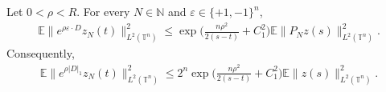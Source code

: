 \documentclass[print,wide]{draft}
\begin{document}
\begin{proposition}
\label{prop:finite-analytic-energy}
Let $0<\rho<R$.  For every $N\in\mathbb{N}$ and
$\varepsilon\in\{+1,-1\}^n$,
\begin{align}\label{eq:one-sided-shift-estimate}
\mathbb{E}\bigl\lVert e^{\rho\varepsilon\cdot D}z_N(t)\bigr\rVert_{L^2(\mathbb{T}^n)}^2
\leq
\exp\biggl(\frac{n\rho^2}{2(s-t)}+C_1^2\biggr)
\mathbb{E}\lVert P_N z(s)\rVert_{L^2(\mathbb{T}^n)}^2.
\end{align}
Consequently,
\begin{align}\label{eq:finite-analytic-norm-estimate}
\mathbb{E}\bigl\lVert e^{\rho|D|_1}z_N(t)\bigr\rVert_{L^2(\mathbb{T}^n)}^2
\leq
2^n\exp\biggl(\frac{n\rho^2}{2(s-t)}+C_1^2\biggr)
\mathbb{E}\lVert z(s)\rVert_{L^2(\mathbb{T}^n)}^2.
\end{align}
\end{proposition}
%
\end{document}
